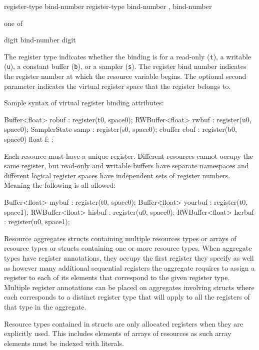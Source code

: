 \begin{grammar}
  \br
   register-type bind-number \terminal{)}\br
   register-type bind-number ,  bind-number \terminal{)}\br

   \textnormal{one of}\br
  \br

  \br
  digit\br
  bind-number digit\br
\end{grammar}

The register type indicates whether the binding is for a read-only (\texttt{t}), a writable (\texttt{u}),
a constant buffer (\texttt{b}), or a sampler (\texttt{s}).
The register bind number indicates the register number at which the resource variable begins.
The optional second parameter indicates the virtual register space that the register belongs to.

Sample syntax of virtual register binding attributes:
\begin{HLSL}
  Buffer<float> robuf : register(t0, space0);
  RWBuffer<float> rwbuf : register(u0, space0);
  SamplerState samp : register(s0, space0);
  cbuffer cbuf : register(b0, space0) { float f; };
\end{HLSL}

Each resource must have a unique register. Different resources cannot occupy the same register,
but read-only and writable buffers have separate namespaces and different logical register spaces have independent
sets of register numbers. Meaning the following is all allowed:
\begin{HLSL}
  Buffer<float> mybuf : register(t0, space0);
  Buffer<float> yourbuf : register(t0, space1);
  RWBuffer<float> hisbuf : register(u0, space0);
  RWBuffer<float> herbuf : register(u0, space1);
\end{HLSL}

Resource aggregates structs containing multiple resources types or arrays of resource types or structs containing one or more resource types.
When aggregate types have register annotations, they occupy the first register they specify as well as however many additional sequential registers
the aggregate requires to assign a register to each of its elements that correspond to the given register type.
Multiple register annotations can be placed on aggregates involving structs where each corresponds to a distinct
register type that will apply to all the registers of that type in the aggregate.

\begin{note}
Resource types contained in structs are only allocated registers when they are explicitly used.
This includes elements of arrays of resources as such array elements must be indexed with literals.
\end{note}

